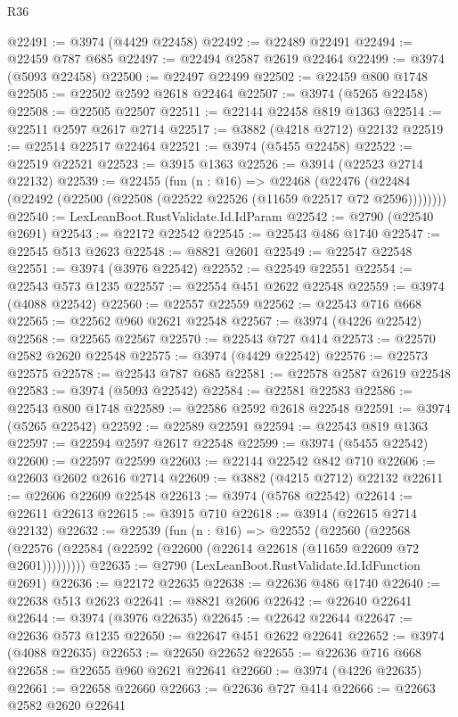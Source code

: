 \begin{lexlean}{R36}
\begin{coremodule}
@22491 := @3974 (@4429 @22458)
@22492 := @22489 @22491
@22494 := @22459 @787 @685
@22497 := @22494 @2587 @2619 @22464
@22499 := @3974 (@5093 @22458)
@22500 := @22497 @22499
@22502 := @22459 @800 @1748
@22505 := @22502 @2592 @2618 @22464
@22507 := @3974 (@5265 @22458)
@22508 := @22505 @22507
@22511 := @22144 @22458 @819 @1363
@22514 := @22511 @2597 @2617 @2714
@22517 := @3882 (@4218 @2712) @22132
@22519 := @22514 @22517 @22464
@22521 := @3974 (@5455 @22458)
@22522 := @22519 @22521
@22523 := @3915 @1363
@22526 := @3914 (@22523 @2714 @22132)
@22539 := @22455
    (fun (n : @16) =>
    @22468 (@22476 (@22484 (@22492 (@22500 (@22508 (@22522 @22526 (@11659 @22517 @72 @2596))))))))
@22540 := LexLeanBoot.RustValidate.Id.IdParam
@22542 := @2790 (@22540 @2691)
@22543 := @22172 @22542
@22545 := @22543 @486 @1740
@22547 := @22545 @513 @2623
@22548 := @8821 @2601
@22549 := @22547 @22548
@22551 := @3974 (@3976 @22542)
@22552 := @22549 @22551
@22554 := @22543 @573 @1235
@22557 := @22554 @451 @2622 @22548
@22559 := @3974 (@4088 @22542)
@22560 := @22557 @22559
@22562 := @22543 @716 @668
@22565 := @22562 @960 @2621 @22548
@22567 := @3974 (@4226 @22542)
@22568 := @22565 @22567
@22570 := @22543 @727 @414
@22573 := @22570 @2582 @2620 @22548
@22575 := @3974 (@4429 @22542)
@22576 := @22573 @22575
@22578 := @22543 @787 @685
@22581 := @22578 @2587 @2619 @22548
@22583 := @3974 (@5093 @22542)
@22584 := @22581 @22583
@22586 := @22543 @800 @1748
@22589 := @22586 @2592 @2618 @22548
@22591 := @3974 (@5265 @22542)
@22592 := @22589 @22591
@22594 := @22543 @819 @1363
@22597 := @22594 @2597 @2617 @22548
@22599 := @3974 (@5455 @22542)
@22600 := @22597 @22599
@22603 := @22144 @22542 @842 @710
@22606 := @22603 @2602 @2616 @2714
@22609 := @3882 (@4215 @2712) @22132
@22611 := @22606 @22609 @22548
@22613 := @3974 (@5768 @22542)
@22614 := @22611 @22613
@22615 := @3915 @710
@22618 := @3914 (@22615 @2714 @22132)
@22632 := @22539
    (fun (n : @16) =>
    @22552
      (@22560
        (@22568 (@22576 (@22584 (@22592 (@22600 (@22614 @22618 (@11659 @22609 @72 @2601)))))))))
@22635 := @2790 (LexLeanBoot.RustValidate.Id.IdFunction @2691)
@22636 := @22172 @22635
@22638 := @22636 @486 @1740
@22640 := @22638 @513 @2623
@22641 := @8821 @2606
@22642 := @22640 @22641
@22644 := @3974 (@3976 @22635)
@22645 := @22642 @22644
@22647 := @22636 @573 @1235
@22650 := @22647 @451 @2622 @22641
@22652 := @3974 (@4088 @22635)
@22653 := @22650 @22652
@22655 := @22636 @716 @668
@22658 := @22655 @960 @2621 @22641
@22660 := @3974 (@4226 @22635)
@22661 := @22658 @22660
@22663 := @22636 @727 @414
@22666 := @22663 @2582 @2620 @22641

\end{coremodule}
\end{lexlean}
